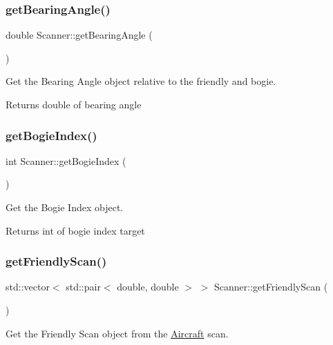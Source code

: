 \subsubsection{\texorpdfstring{get\+Bearing\+Angle()}{getBearingAngle()}}
{\footnotesize\ttfamily double Scanner\+::get\+Bearing\+Angle (\begin{DoxyParamCaption}{ }\end{DoxyParamCaption})}



Get the Bearing Angle object relative to the friendly and bogie. 

\begin{DoxyReturn}{Returns}
double of bearing angle 
\end{DoxyReturn}
\mbox{\label{classScanner_a22fe48ec9b56a6475f5e8a8745adca1f}} 
\subsubsection{\texorpdfstring{get\+Bogie\+Index()}{getBogieIndex()}}
{\footnotesize\ttfamily int Scanner\+::get\+Bogie\+Index (\begin{DoxyParamCaption}{ }\end{DoxyParamCaption})}



Get the Bogie Index object. 

\begin{DoxyReturn}{Returns}
int of bogie index target 
\end{DoxyReturn}
\mbox{\label{classScanner_a32f7e7f5ff6ac8f048263e26b059aae9}} 
\subsubsection{\texorpdfstring{get\+Friendly\+Scan()}{getFriendlyScan()}}
{\footnotesize\ttfamily std\+::vector$<$ std\+::pair$<$ double, double $>$ $>$ Scanner\+::get\+Friendly\+Scan (\begin{DoxyParamCaption}{ }\end{DoxyParamCaption})}



Get the Friendly Scan object from the \hyperlink{structAircraft}{Aircraft} scan. 

